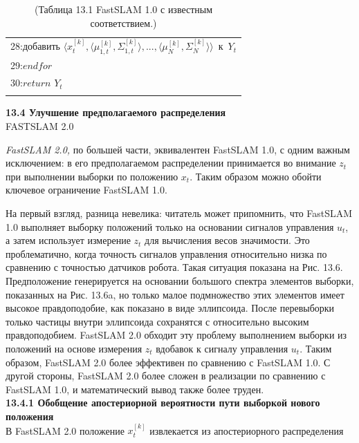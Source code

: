 \documentclass[10pt,a4paper]{article}
\begin{document}
\begin{table}[H]
\begin{center}
\begin{tabular}{|l|}
28:\hspace{9mm}$\textit{добавить }\langle x_t^{[k]},\langle\mu_{1,t}^{[k]},\varSigma_{1,t}^{[k]}\rangle,...,\langle\mu_N^{[k]},\varSigma_N^{[k]}\rangle\rangle\,\textit{ к }\,Y_t$\\
29:\hspace{4mm}$\textit{endfor}$\\
30:\hspace{4mm}$\textit{return}\,\,Y_t$\\
{}\\
\hline
\end{tabular}
\caption{(Таблица 13.1    FastSLAM 1.0 с известным соответствием.)}
\end{center}
\end{table}

\textbf{13.4	Улучшение предполагаемого распределения}\\

FASTSLAM 2.0

\textit{FastSLAM 2.0,} по большей части, эквивалентен FastSLAM 1.0, с одним важным исключением: в его предполагаемом распределении принимается во внимание $z_t$ при выполнении выборки по положению $x_t$.  Таким образом можно обойти ключевое ограничение FastSLAM 1.0.

На первый взгляд, разница невелика: читатель может припомнить, что FastSLAM 1.0 выполняет выборку положений только на основании сигналов управления $u_t$, а затем использует измерение $z_t$ для вычисления весов значимости. Это проблематично, когда точность сигналов управления относительно низка по сравнению с точностью датчиков робота. Такая ситуация показана на Рис. 13.6. Предположение генерируется на основании большого спектра элементов выборки, показанных на Рис. 13.6a, но только малое подмножество этих элементов имеет высокое правдоподобие, как показано в виде эллипсоида. После перевыборки только частицы внутри эллипсоида сохранятся с относительно высоким правдоподобием. FastSLAM 2.0 обходит эту проблему выполнением выборки из положений на основе измерения $z_t$ вдобавок к сигналу управления $u_t$. Таким образом, FastSLAM 2.0 более эффективен по сравнению с FastSLAM 1.0. С другой стороны, FastSLAM 2.0 более сложен в реализации по сравнению с FastSLAM 1.0, и математический вывод также более труден.\\

\textbf{13.4.1	Обобщение апостериорной вероятности пути выборкой нового положения}\\

В FastSLAM 2.0 положение $x_t^{[k]}$ извлекается из апостериорного распределения\\
\end{document}
